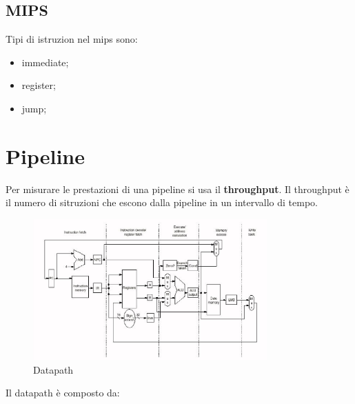 \documentclass[12pt]{article}
\begin{document}
\subsection{MIPS}
Tipi di istruzion nel mips sono:
\begin{itemize}
    \item immediate;
    \item register;
    \item jump;
\end{itemize}

\newpage
\section{Pipeline}
Per misurare le prestazioni di una pipeline si usa il \textbf{throughput}. Il throughput \`e il numero di sitruzioni che escono dalla pipeline in un intervallo di tempo.
\begin{figure}[H]
    \centering
    \includegraphics[width=0.8\textwidth]{datapath.png}
    \caption{Datapath}
    \label{fig:datapath}
\end{figure}
Il datapath \`e composto da:
\end{document}
